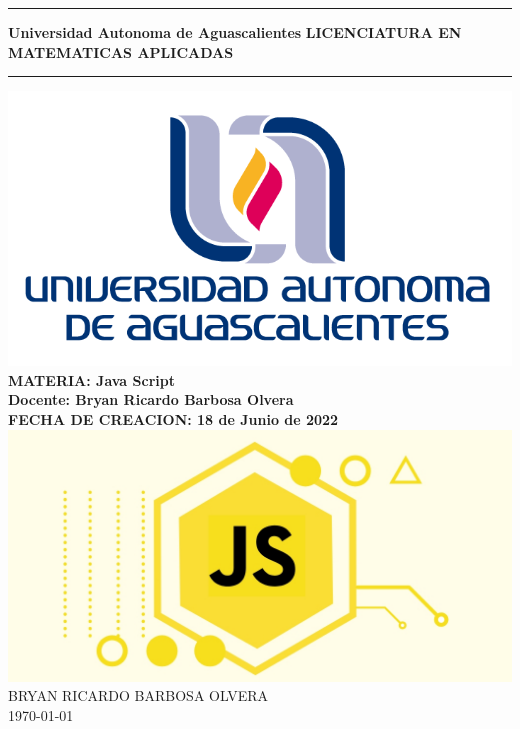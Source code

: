 \documentclass[10pt,a4paper]{article}
\begin{document}
\begin{titlepage}
\begin{center}
\vspace*{2\baselineskip}%
\hrule height 3pt
\vspace*{0.5\baselineskip}%
{\Huge \textbf{Universidad Autonoma de Aguascalientes}}
{\Large \textbf{LICENCIATURA EN MATEMATICAS APLICADAS}}
\vspace*{0.5\baselineskip}%
\hrule
\vspace*{0.5\baselineskip}%
\includegraphics[scale=0.5]{figuras/logo}
\vspace*{2\baselineskip} \\%
\textbf{\large MATERIA: Java Script} \\
\vspace*{1.5\baselineskip}
\textbf{\large Docente: Bryan Ricardo Barbosa Olvera} \\
\vspace*{1.5\baselineskip}
\textbf{\large FECHA DE CREACION: 18 de Junio de 2022} \\  
\vspace*{3\baselineskip}
\includegraphics[scale=0.5]{figuras/imagen}
\vfill
BRYAN RICARDO BARBOSA OLVERA \\
\today \\

\end{center}
\end{titlepage}
\end{document}
